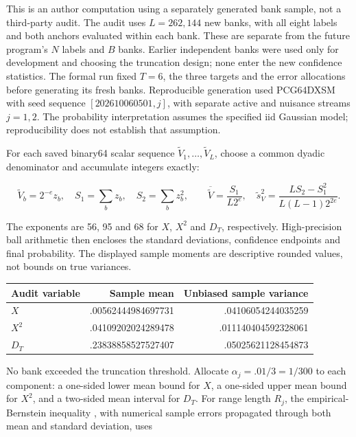 \documentclass{article}
\begin{document}
This is an author computation using a separately generated bank sample,
not a third-party audit. The audit uses \(L=262,144\) new banks, with
all eight labels and both anchors evaluated within each bank. These are
separate from the future program's \(N\) labels and \(B\) banks. Earlier
independent banks were used only for development and choosing the
truncation design; none enter the new confidence statistics. The formal
run fixed \(T=6\), the three targets and the error allocations before
generating its fresh banks. Reproducible generation used PCG64DXSM with
seed sequence \([202610060501,j]\), with separate active and nuisance
streams \(j=1,2\). The probability interpretation assumes the specified
iid Gaussian model; reproducibility does not establish that assumption.

For each saved binary64 scalar sequence
\(\widetilde V_1,\ldots,\widetilde V_L\), choose a common dyadic
denominator and accumulate integers exactly:

\[
\widetilde V_b=2^{-e}z_b,\quad S_1=\sum_bz_b,\quad S_2=\sum_bz_b^2,\qquad
\overline{\widetilde V}=\frac{S_1}{L2^e},\quad
\widetilde s_V^2=\frac{LS_2-S_1^2}{L(L-1)2^{2e}}.
\tag{D.8}
\]

The exponents are 56, 95 and 68 for \(X\), \(X^2\) and \(D_T\),
respectively. High-precision ball arithmetic then encloses the standard
deviations, confidence endpoints and final probability. The displayed
sample moments are descriptive rounded values, not bounds on true
variances.

\begin{longtable}[]{@{}lrr@{}}
\toprule\noalign{}
Audit variable & Sample mean & Unbiased sample variance \\
\midrule\noalign{}
\endhead
\bottomrule\noalign{}
\endlastfoot
\(X\) & .00562444984697731 & .04106054244035259 \\
\(X^2\) & .04109202024289478 & .011140404592328061 \\
\(D_T\) & .23838858527527407 & .05025621128454873 \\
\end{longtable}

No bank exceeded the truncation threshold. Allocate
\(\alpha_j=.01/3=1/300\) to each component: a one-sided lower mean bound
for \(X\), a one-sided upper mean bound for \(X^2\), and a two-sided
mean interval for \(D_T\). For range length \(R_j\), the
empirical-Bernstein inequality \citep[Theorem 4]{maurer2009}, with
numerical sample errors propagated through both mean and standard
deviation, uses
\end{document}
